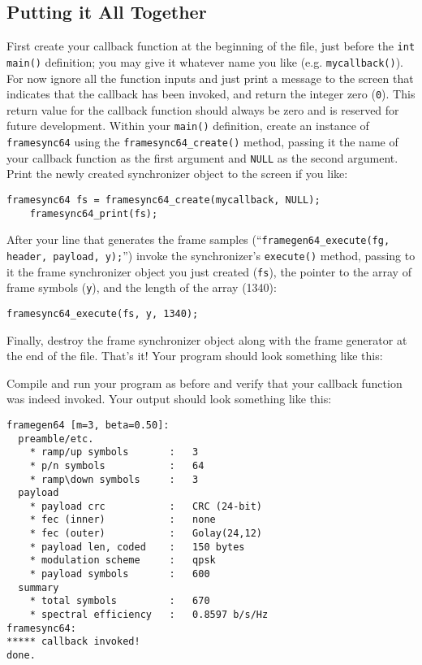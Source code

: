 %
%
\subsection{Putting it All Together}
\label{tutorial:framing:xxx}

First create your callback function at the beginning of the file, just
before the {\tt int main()} definition;
you may give it whatever name you like (e.g. {\tt mycallback()}).
For now ignore all the function inputs and just print a message to the
screen that indicates that the callback has been invoked,
and return the integer zero ({\tt 0}).
This return value for the callback function should always be zero
and is reserved for future development.
Within your {\tt main()} definition, create an instance of
{\tt framesync64} using the {\tt framesync64\_create()} method,
passing it the name of your callback function as the first argument
and {\tt NULL} as the second argument.
Print the newly created synchronizer object to the screen if you like:
%
\begin{Verbatim}[fontsize=\small]
    framesync64 fs = framesync64_create(mycallback, NULL);
    framesync64_print(fs);
\end{Verbatim}
%
After your line that generates the frame samples
(``{\tt framegen64\_execute(fg, header, payload, y);}'')
invoke the synchronizer's {\tt execute()} method,
passing to it the frame synchronizer object you just created ({\tt fs}),
the pointer to the array of frame symbols ({\tt y}),
and the length of the array (1340):
%
\begin{Verbatim}[fontsize=\small]
    framesync64_execute(fs, y, 1340);
\end{Verbatim}
%
Finally, destroy the frame synchronizer object along with the frame
generator at the end of the file.
That's it!
Your program should look something like this:
%

%
Compile and run your program as before and verify that your callback
function was indeed invoked.
Your output should look something like this:
%
\begin{Verbatim}[fontsize=\small]
framegen64 [m=3, beta=0.50]:
  preamble/etc.
    * ramp/up symbols       :   3
    * p/n symbols           :   64
    * ramp\down symbols     :   3
  payload
    * payload crc           :   CRC (24-bit)
    * fec (inner)           :   none
    * fec (outer)           :   Golay(24,12)
    * payload len, coded    :   150 bytes
    * modulation scheme     :   qpsk
    * payload symbols       :   600
  summary
    * total symbols         :   670
    * spectral efficiency   :   0.8597 b/s/Hz
framesync64:
***** callback invoked!
done.
\end{Verbatim}
